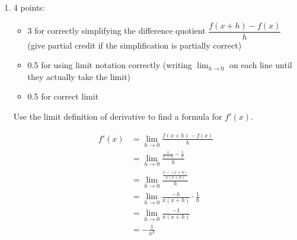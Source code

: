 \documentclass{article}
\begin{document}
\begin{enumerate}
\begin{enumerate}
    \begin{solution}       
      \begin{center}
      \end{center}
      At any point on the graph of $f(x)$, the slope of the tangent line is negative, so $f'(x)$ is always negative.

      Because $f$ is odd, the slope of the tangent line at $x = a$ is equal to the slope of the tangent line at $x = -a$. That makes $f'$ even.

      As $x$ gets close to 0, the slope of the tangent line becomes very steep, so $f'$ is very negative when $x$ is close to 0.
    \end{solution}

  \item \label{derivative-of-1/x-calculate}

    \begin{grading} 
      4 points:
      \begin{itemize}[nosep]
      \item 3 for correctly simplifying the difference quotient $\dfrac{ f(x+h) - f(x) }{h}$ (give partial credit if the simplification is partially correct)
      \item 0.5 for using limit notation correctly (writing $\displaystyle \lim_{h \to 0}$ on each line until they actually take the limit)
      \item 0.5 for correct limit
      \end{itemize}
    \end{grading} 

    \begin{problem}[\nstretch{2.25}]
      Use the limit definition of derivative to find a formula for $f'(x)$.
    \end{problem}

    \begin{solution}  
      \begin{align*}
        f'(x) &= \displaystyle \lim_{h \rightarrow 0} \frac{ f(x+h) - f(x) }{h} \\
        &= \displaystyle \lim_{h \rightarrow 0} \frac{ \frac{1}{x+h} - \frac{1}{x} } {h} \\
        &= \displaystyle \lim_{h \rightarrow 0} \frac{ \frac{ x - (x+h)}{x(x+h)}}{h}\\
        &= \displaystyle \lim_{h \rightarrow 0}  \frac{-h}{x(x+h)} \cdot \frac{ 1 } {h} \\
        &= \displaystyle \lim_{h \rightarrow 0}\frac{ -1}{x(x+h)} \\
        & =\boxed{ -\frac{1}{x^2}}\\
      \end{align*}
    \end{solution}


\end{enumerate}
\end{enumerate}
\end{document}
